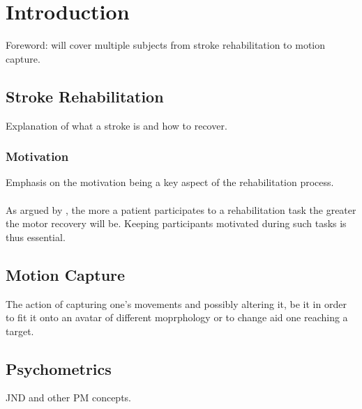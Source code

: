 
\chapter{Introduction} %

\label{Chapter1} %


Foreword: will cover multiple subjects from stroke rehabilitation to motion capture.

\section{Stroke Rehabilitation}

Explanation of what a stroke is and how to recover.

\subsection{Motivation}

Emphasis on the motivation being a key aspect of the rehabilitation process.
\\\\
As argued by \cite{flores2008improving}, the more a patient participates to a rehabilitation task the greater the motor recovery will be. Keeping participants motivated during such tasks is thus essential.

\section{Motion Capture}

The action of capturing one's movements and possibly altering it, be it in order to fit
it onto an avatar of different moprphology or to change aid one reaching a target.

\section{Psychometrics}

JND and other PM concepts.
